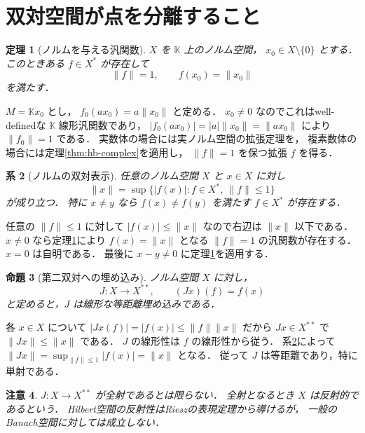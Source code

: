 \documentclass[a5paper,10pt,onecolumn]{jsarticle}
\makeatletter
\theoremstyle{mathnotetheorem}
\newtheorem{theorem}{定理}[section]
\newtheorem{proposition}[theorem]{命題}
\newtheorem{corollary}[theorem]{系}
\newtheorem{remark}[theorem]{注意}
\renewcommand{\proofname}{証明}
\renewenvironment{proof}[1][\proofname]{%
  \par\pushQED{\qed}\normalfont\topsep4\p@\@plus2\p@\relax
  \trivlist\item[\hskip\labelsep\bfseries #1]\ignorespaces
}{\popQED\endtrivlist\@endpefalse}
\makeatother
\begin{document}
\section{双対空間が点を分離すること}

\begin{theorem}[ノルムを与える汎関数]\label{thm:norming}
$X$ を $\mathbb K$ 上のノルム空間，
$x_0\in X\setminus\{0\}$ とする．
このときある $f\in X^*$ が存在して
\[
 \|f\|=1,\qquad f(x_0)=\|x_0\|
\]
を満たす．
\end{theorem}
\begin{proof}
$M=\mathbb Kx_0$ とし，
$f_0(ax_0)=a\|x_0\|$ と定める．
$x_0\ne0$ なのでこれはwell-definedな
$\mathbb K$ 線形汎関数であり，
$|f_0(ax_0)|=|a|\|x_0\|=\|ax_0\|$ により
$\|f_0\|=1$ である．
実数体の場合には実ノルム空間の拡張定理を，
複素数体の場合には定理\ref{thm:hb-complex}を適用し，
$\|f\|=1$ を保つ拡張 $f$ を得る．
\end{proof}

\begin{corollary}[ノルムの双対表示]\label{cor:dualnorm}
任意のノルム空間 $X$ と $x\in X$ に対し
\[
 \|x\|=
 \sup\{|f(x)|:f\in X^*,\ \|f\|\le1\}
\]
が成り立つ．
特に $x\ne y$ なら $f(x)\ne f(y)$ を満たす
$f\in X^*$ が存在する．
\end{corollary}
\begin{proof}
任意の $\|f\|\le1$ に対して
$|f(x)|\le\|x\|$ なので右辺は $\|x\|$ 以下である．
$x\ne0$ なら定理\ref{thm:norming}により
$f(x)=\|x\|$ となる $\|f\|=1$ の汎関数が存在する．
$x=0$ は自明である．
最後に $x-y\ne0$ に定理\ref{thm:norming}を適用する．
\end{proof}

\begin{proposition}[第二双対への埋め込み]\label{prop:bidual}
ノルム空間 $X$ に対し，
\[
 J:X\to X^{**},\qquad (Jx)(f)=f(x)
\]
と定めると，$J$ は線形な等距離埋め込みである．
\end{proposition}
\begin{proof}
各 $x\in X$ について
$|Jx(f)|=|f(x)|\le\|f\|\|x\|$ だから
$Jx\in X^{**}$ で $\|Jx\|\le\|x\|$ である．
$J$ の線形性は $f$ の線形性から従う．
系\ref{cor:dualnorm}によって
$\|Jx\|=\sup_{\|f\|\le1}|f(x)|=\|x\|$ となる．
従って $J$ は等距離であり，特に単射である．
\end{proof}

\begin{remark}
$J:X\to X^{**}$ が全射であるとは限らない．
全射となるとき $X$ は反射的であるという．
Hilbert空間の反射性はRieszの表現定理から導けるが，
一般のBanach空間に対しては成立しない．
\end{remark}
\end{document}
